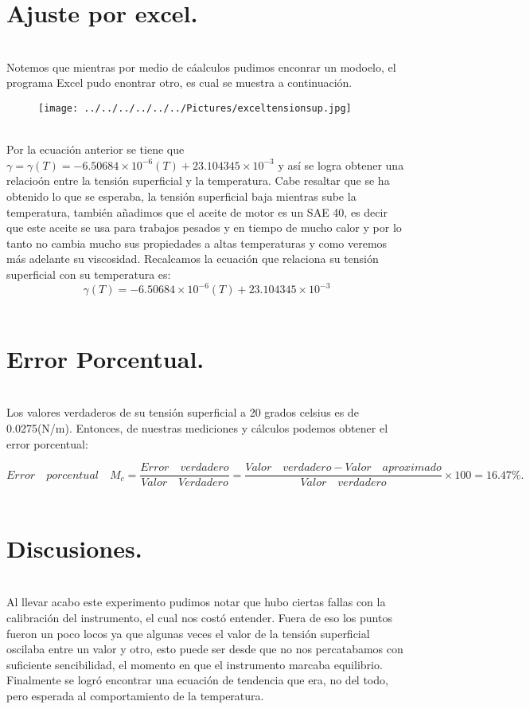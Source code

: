 \documentclass[10pt,a4paper]{article}
\begin{document}
\section*{Ajuste por excel.}\\
Notemos que mientras por medio de c\'{a}alculos pudimos enconrar un modoelo, el programa Excel pudo enontrar otro, es cual se muestra a continuaci\'{o}n.
\\
\begin{figure}[hbtp]
 \centering
\texttt{[image: ../../../../../../Pictures/exceltensionsup.jpg]} 
\end{figure}
\\
Por la ecuaci\'{o}n anterior se tiene que $\gamma= \gamma (T) = -6.50684\times { 10 }^{ -6 }(T) + 23.104345\times { 10 }^{ -3 } $ y as\'{i} se logra obtener una relacio\'{o}n entre la tensi\'{o}n superficial y la temperatura. Cabe resaltar que se ha obtenido lo que se esperaba, la tensi\'{o}n superficial baja mientras sube la temperatura, tambi\'{e}n a\~{n}adimos que el aceite de motor es un SAE 40, es decir  que este aceite se usa para trabajos pesados y en tiempo de mucho calor y por lo tanto  no cambia mucho sus propiedades a altas temperaturas y como veremos m\'{a}s adelante su viscosidad. Recalcamos la ecuaci\'{o}n que relaciona su tensi\'{o}n superficial con su temperatura es:
\[ \gamma (T) =  -6.50684\times { 10 }^{ -6 }(T) + 23.104345\times { 10 }^{ -3 } \]
\\
\section*{Error Porcentual.}\\
Los valores verdaderos de su tensi\'{o}n superficial a 20 grados celsius es de 0.0275(N/m). Entonces, de nuestras mediciones y c\'{a}lculos podemos obtener el error porcentual:

\[{ E }rror\quad porcentual\quad { M }_{ c }=\frac { Error\quad verdadero }{ Valor\quad Verdadero } =\frac { Valor\quad verdadero - Valor\quad aproximado }{ Valor\quad verdadero } \times 100= 16.47\%. \]
\\
 \section*{Discusiones.}\\
Al llevar acabo este experimento pudimos notar que hubo ciertas fallas con la calibraci\'{o}n del instrumento, el cual nos cost\'{o} entender. Fuera de eso los puntos fueron un poco locos ya que algunas veces el valor de la tensi\'{o}n superficial oscilaba entre un valor y otro, esto puede ser desde que no nos percatabamos con suficiente sencibilidad, el momento en que el instrumento marcaba equilibrio. Finalmente se logr\'{o} encontrar una ecuaci\'{o}n de tendencia que era, no del todo, pero esperada al comportamiento de la temperatura. 
\end{document}

